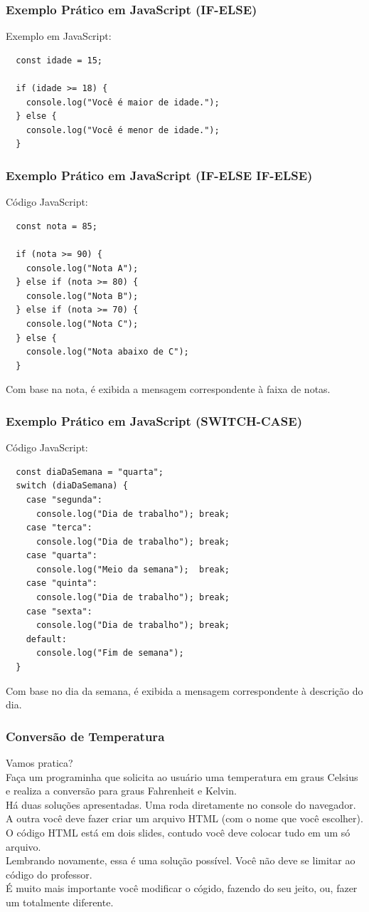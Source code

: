 \documentclass[13pt, xcolor={dvipsnames,svgnames}, portuguese]{beamer}
\begin{document}
\begin{frame}[fragile]
  \frametitle{Exemplo Prático em JavaScript (IF-ELSE)}
  Exemplo em JavaScript:
  \begin{verbatim}
  const idade = 15;

  if (idade >= 18) {
    console.log("Você é maior de idade.");
  } else {
    console.log("Você é menor de idade.");
  }
  \end{verbatim}
\end{frame}


\begin{frame}[fragile]
  \frametitle{Exemplo Prático em JavaScript (IF-ELSE IF-ELSE)}
  Código JavaScript:
  \begin{verbatim}
  const nota = 85;

  if (nota >= 90) {
    console.log("Nota A");
  } else if (nota >= 80) {
    console.log("Nota B");
  } else if (nota >= 70) {
    console.log("Nota C");
  } else {
    console.log("Nota abaixo de C");
  }
  \end{verbatim}
  Com base na nota, é exibida a mensagem correspondente à faixa de notas.
\end{frame}


\begin{frame}[fragile]
  \frametitle{Exemplo Prático em JavaScript (SWITCH-CASE)}
  Código JavaScript:
  \begin{verbatim}
  const diaDaSemana = "quarta";
  switch (diaDaSemana) {
    case "segunda":
      console.log("Dia de trabalho"); break;
    case "terca":
      console.log("Dia de trabalho"); break;
    case "quarta":
      console.log("Meio da semana");  break;
    case "quinta":
      console.log("Dia de trabalho"); break;
    case "sexta":
      console.log("Dia de trabalho"); break;
    default:
      console.log("Fim de semana");
  }
  \end{verbatim}
  Com base no dia da semana, é exibida a mensagem correspondente à descrição do dia.
\end{frame}


\begin{frame}[fragile]
  \frametitle{Conversão de Temperatura}
  Vamos pratica?\\ Faça um programinha que solicita ao usuário uma temperatura em graus Celsius e realiza a conversão para graus Fahrenheit e Kelvin.\\
  Há duas soluções apresentadas. Uma roda diretamente no console do navegador.\\
  A outra você deve fazer criar um arquivo HTML (com o nome que você escolher).\\
  O código HTML está em dois slides, contudo você deve colocar tudo em um só arquivo.\\
  Lembrando novamente, essa é uma solução possível. Você não deve se limitar ao código do professor.\\
  É muito mais importante você modificar o cógido, fazendo do seu jeito, ou, fazer um totalmente diferente.
\end{frame}
\end{document}
